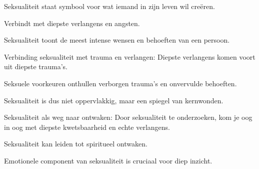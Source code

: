 Seksualiteit staat symbool voor wat iemand in zijn leven wil creëren.

Verbindt met diepste verlangens en angsten.

Seksualiteit toont de meest intense wensen en behoeften van een persoon.

Verbinding seksualiteit met trauma en verlangen:
Diepste verlangens komen voort uit diepste trauma’s.

Seksuele voorkeuren onthullen verborgen trauma's en onvervulde behoeften.

Seksualiteit is dus niet oppervlakkig, maar een spiegel van kernwonden.

Seksualiteit als weg naar ontwaken:
Door seksualiteit te onderzoeken, kom je oog in oog met diepste kwetsbaarheid en echte verlangens.

Seksualiteit kan leiden tot spiritueel ontwaken.

Emotionele component van seksualiteit is cruciaal voor diep inzicht.
